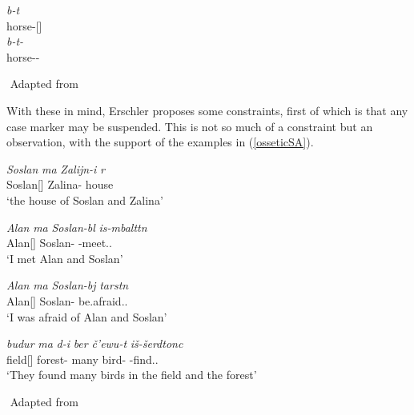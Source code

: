 \begin{exe}
    \ex \label{osseticdeletion}
    \begin{xlist}
        \ex \gll
        \textit{b\textturna\textchi-t\textturna} \\ horse-{\Pl}[{\Nom}] \\
        
        \ex \gll 
        \textit{b\textturna\textchi-t-\textschwa} \\ horse-{\Pl}-{\Obl} \\
    \end{xlist}
    ${}$ \hfill Adapted from \cite{erschler2012suspended}
\end{exe}

With these in mind, Erschler proposes some constraints, first of which is that any case marker may be suspended. This is not so much of a constraint but an observation, with the support of the examples in (\ref{osseticSA}).

\begin{exe}
    \ex \label{osseticSA}
    \begin{xlist}
        \ex \gll 
        \textit{Soslan} \textit{\textturna ma} \textit{Zalijn-i} \textit{\textchi\textturna\textdzlig r\textturna} \\ Soslan[{\Nom}] {\And} Zalina-{\Obl} house \\
        \glt `the house of Soslan and Zalina'
        
        \ex \gll 
        \textit{Alan} \textit{\textturna ma} \textit{Soslan-b\textturna l} \textit{is-\textturna mbaltt\textturna n} \\ Alan[{\Nom}] {\And} Soslan-{\Sup} {\Prv}-meet.{\Pst}.{\First}{\Sg} \\
        \glt `I met Alan and Soslan'
        
        \ex \gll 
        \textit{Alan} \textit{\textturna ma} \textit{Soslan-b\textturna j} \textit{tarst\textturna n} \\ Alan[{\Nom}] {\And} Soslan-{\Abl} be.afraid.{\Pst}.{\First}{\Sg} \\
        \glt `I was afraid of Alan and Soslan'
        
        \ex \gll 
        \textit{budur} \textit{\textturna ma} \textit{\textinvscr\textturna d-i} \textit{ber\textturna} \textit{\v{c}'ewu-t\textturna} \textit{i\v{s}-\v{s}erdtonc\textturna} \\ field[{\Nom}] {\And} forest-{\Loc} many bird-{\Pl} {\Prv}-find.{\Pst}.{\Third}{\Pl} \\
        \glt `They found many birds in the field and the forest'
    \end{xlist}
    ${}$ \hfill Adapted from \cite{erschler2012suspended}
\end{exe}


